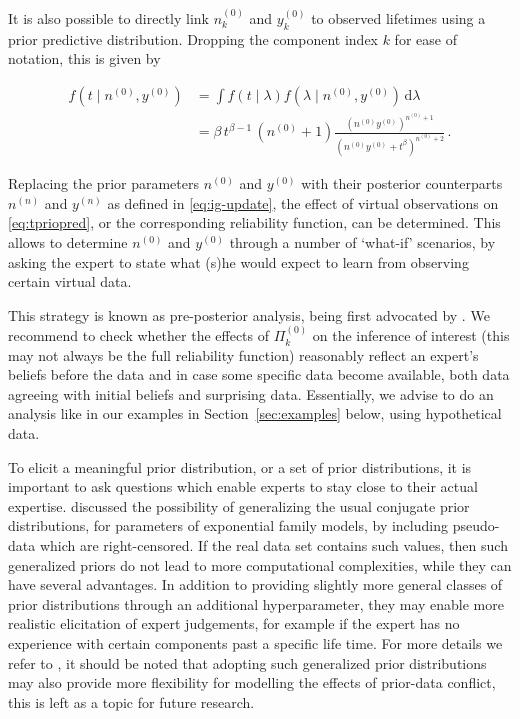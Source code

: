 \documentclass[Journal,SectionNumbers,InsideFigs]{ascelike}
\newcommand{\dd}{\,\mathrm{d}}
\newcommand{\uz}{^{(0)}} %
\newcommand{\un}{^{(n)}} %
\def\yz{y\uz}
\def\yn{y\un}
\def\ykz{y\uz_k}
\def\nz{n\uz}
\def\nn{n\un}
\def\nkz{n\uz_k}
\def\PkZ{\Pi\uz_k}
\begin{document}
It is also possible to directly link $\nkz$ and $\ykz$
to observed lifetimes using a prior predictive distribution.
Dropping the component index $k$ for ease of notation, this is given by
\begin{linenomath*}
\begin{align}
f(t\mid \nz, \yz)
 &= \int f(t\mid \lambda) f(\lambda\mid\nz,\yz) \dd \lambda \nonumber\\
 &= \beta\, t^{\beta - 1}\, (\nz + 1) \frac{(\nz \yz)^{\nz + 1}}{(\nz \yz + t^\beta)^{\nz + 2}} \,.
\label{eq:tpriopred}
\end{align}
\end{linenomath*}
Replacing the prior parameters $\nz$ and $\yz$
with their posterior counterparts $\nn$ and $\yn$ as defined in \eqref{eq:ig-update},
the effect of virtual observations on \eqref{eq:tpriopred}, or the corresponding reliability function, can be determined.
This allows to determine $\nz$ and $\yz$ through a number of `what-if' scenarios,
by asking the expert to state what (s)he would expect to learn from observing certain virtual data.

This strategy is known as pre-posterior analysis,
being first advocated by .
We recommend to check whether the effects of $\PkZ$ on the inference of interest
(this may not always be the full reliability function)
reasonably reflect an expert's beliefs before the data and in case some specific data become available,
both data agreeing with initial beliefs and surprising data.
Essentially, we advise to do an analysis like in our examples in Section~\ref{sec:examples} below,
using hypothetical data.

To elicit a meaningful prior distribution, or a set of prior distributions,
it is important to ask questions which enable experts to stay close to their actual expertise.
 discussed the possibility of generalizing the usual conjugate prior distributions,
for parameters of exponential family models, by including pseudo-data which are right-censored.
If the real data set contains such values, then such generalized priors do not lead to more computational complexities,
while they can have several advantages.
In addition to providing slightly more general classes of prior distributions through an additional hyperparameter,
they may enable more realistic elicitation of expert judgements,
for example if the expert has no experience with certain components past a specific life time.
For more details we refer to ,
it should be noted that adopting such generalized prior distributions
may also provide more flexibility for modelling the effects of prior-data conflict,
this is left as a topic for future research.
\end{document}
